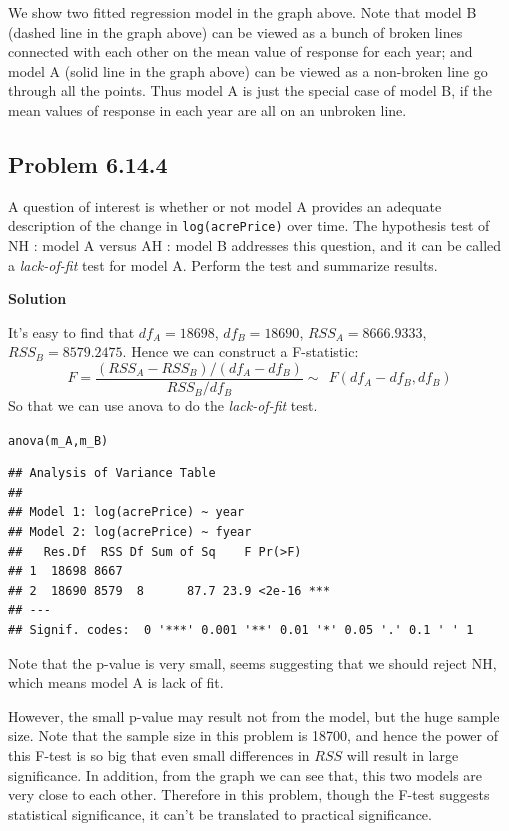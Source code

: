 \documentclass[12pt,oneside,a4paper]{article}\usepackage[]{graphicx}\usepackage[]{xcolor}
\makeatletter
\newcommand{\hlstd}[1]{\textcolor[rgb]{0,0,0}{#1}}%
\newcommand{\hlkwd}[1]{\textcolor[rgb]{0,0,0}{#1}}%
\newenvironment{kframe}{%
 \def\at@end@of@kframe{}%
 \ifinner\ifhmode%
  \def\at@end@of@kframe{\end{minipage}}%
  \begin{minipage}{\columnwidth}%
 \fi\fi%
 \def\FrameCommand##1{\hskip\@totalleftmargin \hskip-\fboxsep
 \colorbox{shadecolor}{##1}\hskip-\fboxsep
     \hskip-\linewidth \hskip-\@totalleftmargin \hskip\columnwidth}%
 \MakeFramed {\advance\hsize-\width
   \@totalleftmargin\z@ \linewidth\hsize
   \@setminipage}}%
 {\par\unskip\endMakeFramed%
 \at@end@of@kframe}
\newenvironment{knitrout}{}{} %
\newcommand{\subproblem}[1]
{
    \subsection*{Problem {#1}}
}
\newcommand{\solution}
{
    \vspace{15pt}
    \noindent\ignorespaces\textbf{\large Solution}
}
\newcommand{\m}[1]{\texttt{{#1}}}
\makeatother
\begin{document}
We show two fitted regression model in the graph above. Note that model B (dashed line in the graph above) can be viewed as a bunch of broken lines connected with each other on the mean value of response for each year; and model A (solid line in the graph above) can be viewed as a non-broken line go through all the points. Thus model A is just the special case of model B, if the mean values of response in each year are all on an unbroken line.

\subproblem{6.14.4}
A question of interest is whether or not model A provides an adequate description of the change in \m{log(acrePrice)} over time. The hypothesis test of NH : model A versus AH : model B addresses this question, and it can be called a \emph{lack-of-fit} test for model A. Perform the test and summarize results.

\solution

It's easy to find that $df_{A} = 18698$, $df_{B} = 18690$, $RSS_{A} = 8666.9333$, $RSS_{B} = 8579.2475$. Hence we can construct a F-statistic:
$$F = \frac{(RSS_{A} - RSS_{B}) / (df_{A} - df_{B})}{RSS_{B} / df_{B}} \sim~~F(df_{A} - df_{B}, df_{B})$$
So that we can use anova to do the \emph{lack-of-fit} test.
\begin{knitrout}
\color{fgcolor}\begin{kframe}
\begin{alltt}
\hlkwd{anova}\hlstd{(m_A, m_B)}
\end{alltt}
\begin{verbatim}
## Analysis of Variance Table
## 
## Model 1: log(acrePrice) ~ year
## Model 2: log(acrePrice) ~ fyear
##   Res.Df  RSS Df Sum of Sq    F Pr(>F)    
## 1  18698 8667                             
## 2  18690 8579  8      87.7 23.9 <2e-16 ***
## ---
## Signif. codes:  0 '***' 0.001 '**' 0.01 '*' 0.05 '.' 0.1 ' ' 1
\end{verbatim}
\end{kframe}
\end{knitrout}
Note that the p-value is very small, seems suggesting that we should reject NH, which means model A is lack of fit. \par
However, the small p-value may result not from the model, but the huge sample size. Note that the sample size in this problem is 18700, and hence the power of this F-test is so big that even small differences in $RSS$ will result in large significance. In addition, from the graph we can see that, this two models are very close to each other. Therefore in this problem, though the F-test suggests statistical significance, it can't be translated to practical significance.
\end{document}
